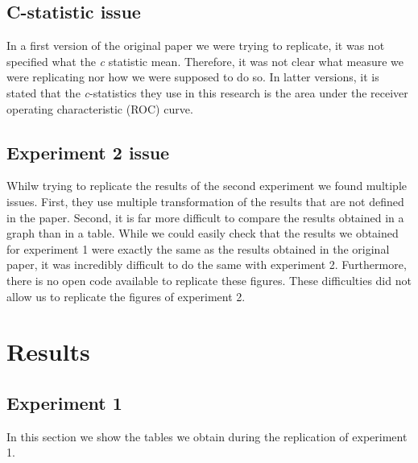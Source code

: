 \documentclass[10,a4paperpaper,]{article}
\begin{document}
\subsection{C-statistic issue}

In a first version of the original paper we were trying to replicate, it
was not specified what the \emph{c} statistic mean. Therefore, it was
not clear what measure we were replicating nor how we were supposed to
do so. In latter versions, it is stated that the \emph{c}-statistics
they use in this research is the area under the receiver operating
characteristic (ROC) curve.

\subsection{Experiment 2 issue}

Whilw trying to replicate the results of the second experiment we found
multiple issues. First, they use multiple transformation of the results
that are not defined in the paper. Second, it is far more difficult to
compare the results obtained in a graph than in a table. While we could
easily check that the results we obtained for experiment 1 were exactly
the same as the results obtained in the original paper, it was
incredibly difficult to do the same with experiment 2. Furthermore,
there is no open code available to replicate these figures. These
difficulties did not allow us to replicate the figures of experiment 2.

\section{Results}

\subsection{Experiment 1}

In this section we show the tables we obtain during the replication of
experiment 1.
\end{document}
